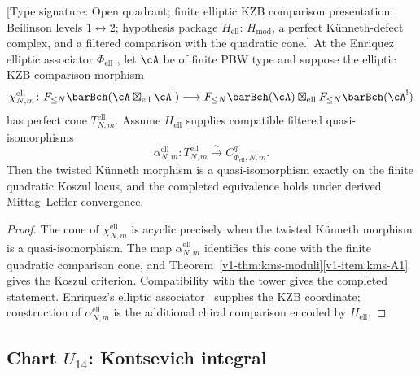 \begin{proposition}
\label{v1-prop:kms-elliptic-chart}
\ClaimStatusConditional
\textup{[Type signature: Open quadrant; finite elliptic KZB
comparison presentation; Beilinson levels $1\leftrightarrow2$;
hypothesis package $H_{\mathrm{ell}}$: $H_{\mathrm{mod}}$, a perfect
K\"unneth-defect complex, and a filtered comparison with the
quadratic cone.]}
At the Enriquez elliptic associator $\Phi_{\mathrm{ell}}$
\cite{Enriquez14}, let $\cA$ be of finite PBW type and suppose
the elliptic KZB comparison morphism
\[
 \chi^{\mathrm{ell}}_{N,m}\colon
 F_{\leq N}\barBch(\cA \boxtimes_{\mathrm{ell}} \cA^!)
 \longrightarrow
 F_{\leq N}\barBch(\cA) \boxtimes_{\mathrm{ell}}
 F_{\leq N}\barBch(\cA^!)
\]
has perfect cone $T^{\mathrm{ell}}_{N,m}$.  Assume
$H_{\mathrm{ell}}$ supplies compatible filtered
quasi-isomorphisms
\[
 \alpha^{\mathrm{ell}}_{N,m}\colon
 T^{\mathrm{ell}}_{N,m}\xrightarrow{\sim}
 C^q_{\Phi_{\mathrm{ell}},N,m}.
\]
Then the twisted K\"unneth morphism is a quasi-isomorphism exactly
on the finite quadratic Koszul locus, and the completed equivalence
holds under derived Mittag--Leffler convergence.
\end{proposition}

\begin{proof}
The cone of $\chi^{\mathrm{ell}}_{N,m}$ is acyclic precisely when
the twisted K\"unneth morphism is a quasi-isomorphism.  The map
$\alpha^{\mathrm{ell}}_{N,m}$ identifies this cone with the finite
quadratic comparison cone, and
Theorem~\ref{v1-thm:kms-moduli}\ref{v1-item:kms-A1} gives the
Koszul criterion.  Compatibility with the tower gives the completed
statement.  Enriquez's elliptic associator~\cite{Enriquez14}
supplies the KZB coordinate; construction of
$\alpha^{\mathrm{ell}}_{N,m}$ is the additional chiral comparison
encoded by $H_{\mathrm{ell}}$.
\end{proof}

\subsection{Chart $U_{14}$: Kontsevich integral}

